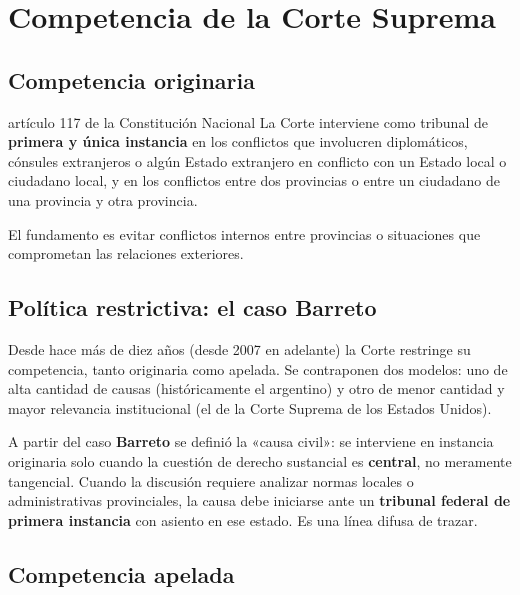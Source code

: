 \documentclass[12pt,oneside]{book}
\begin{document}
\section{Competencia de la Corte Suprema}

\subsection{Competencia originaria}

\begin{regla}{artículo 117 de la Constitución Nacional}
La Corte interviene como tribunal de \textbf{primera y única instancia} en los conflictos que involucren diplomáticos, cónsules extranjeros o algún Estado extranjero en conflicto con un Estado local o ciudadano local, y en los conflictos entre dos provincias o entre un ciudadano de una provincia y otra provincia.
\end{regla}

El fundamento es evitar conflictos internos entre provincias o situaciones que comprometan las relaciones exteriores.

\subsection{Política restrictiva: el caso Barreto}

Desde hace más de diez años (desde 2007 en adelante) la Corte restringe su competencia, tanto originaria como apelada. Se contraponen dos modelos: uno de alta cantidad de causas (históricamente el argentino) y otro de menor cantidad y mayor relevancia institucional (el de la Corte Suprema de los Estados Unidos).

A partir del caso \textbf{Barreto} se definió la «causa civil»: se interviene en instancia originaria solo cuando la cuestión de derecho sustancial es \textbf{central}, no meramente tangencial. Cuando la discusión requiere analizar normas locales o administrativas provinciales, la causa debe iniciarse ante un \textbf{tribunal federal de primera instancia} con asiento en ese estado. Es una línea difusa de trazar.

\subsection{Competencia apelada}
\end{document}
